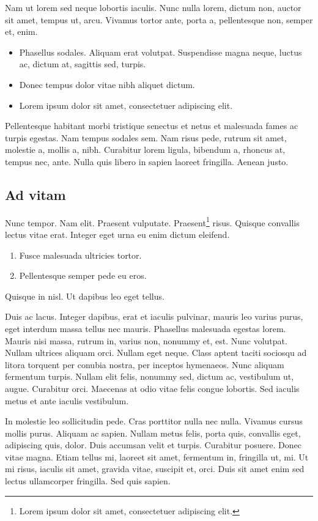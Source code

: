 \documentclass[a4paper,twoside,10pt,english,french]{article}   %
\newcommand{\mymarginpar}[1]{%
  \marginpar[\raggedleft\footnotesize#1]{\raggedright\footnotesize#1}
}
\theoremstyle{definition}
\theoremstyle{remark}
\theoremstyle{plain}
\begin{document}
Nam ut lorem sed neque lobortis iaculis. Nunc nulla lorem, dictum non, auctor sit amet, tempus ut, arcu. Vivamus tortor ante, porta a, pellentesque non, semper et, enim.
\begin{itemize}
  \item Phasellus sodales. Aliquam erat volutpat. Suspendisse magna neque, luctus ac, dictum at, sagittis sed, turpis.
  \item Donec tempus dolor vitae nibh aliquet dictum.
  \item Lorem ipsum dolor sit amet, consectetuer adipiscing elit.
\end{itemize}
Pellentesque habitant morbi tristique senectus et netus et malesuada fames ac turpis egestas. Nam tempus sodales sem. Nam risus pede, rutrum sit amet, molestie a, mollis a, nibh. Curabitur lorem ligula, bibendum a, rhoncus at, tempus nec, ante. Nulla quis libero in sapien laoreet fringilla. Aenean justo.

\subsection{Ad vitam}

Nunc tempor. Nam elit. Praesent vulputate. Praesent\footnote{Lorem ipsum dolor sit amet, consectetuer adipiscing elit.} risus. Quisque convallis lectus vitae erat. Integer eget urna eu enim dictum eleifend.
\begin{enumerate}
  \item Fusce malesuada ultricies tortor.
  \item Pellentesque semper pede eu eros.
\end{enumerate}
Quisque in nisl. Ut dapibus leo eget tellus.

Duis ac lacus. Integer dapibus, erat et iaculis pulvinar, mauris leo varius purus, eget interdum massa tellus nec mauris. Phasellus malesuada egestas lorem. \mymarginpar{Nunc est bibendum} Mauris nisi massa, rutrum in, varius non, nonummy et, est. Nunc volutpat. Nullam ultrices aliquam orci. Nullam eget neque. Class aptent taciti sociosqu ad litora torquent per conubia nostra, per inceptos hymenaeos. Nunc aliquam fermentum turpis. Nullam elit felis, nonummy sed, dictum ac, vestibulum ut, augue. Curabitur orci. Maecenas at odio vitae felis congue lobortis. Sed iaculis metus et ante iaculis vestibulum.

In molestie leo sollicitudin pede. Cras porttitor nulla nec nulla. Vivamus cursus mollis purus. Aliquam ac sapien. Nullam metus felis, porta quis, convallis eget, adipiscing quis, dolor. Duis accumsan velit et turpis. Curabitur posuere. Donec vitae magna. Etiam tellus mi, laoreet sit amet, fermentum in, fringilla ut, mi. Ut mi risus, iaculis sit amet, gravida vitae, suscipit et, orci. Duis sit amet enim sed lectus ullamcorper fringilla. Sed quis sapien.
\end{document}

